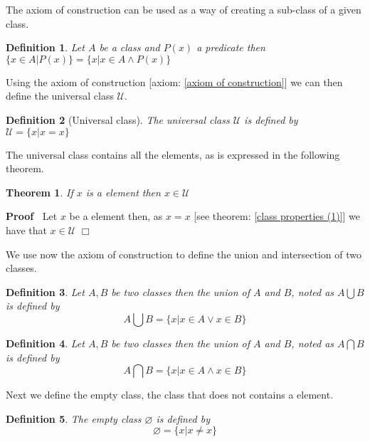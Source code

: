 \documentclass{book}
\newenvironment{proof}{\noindent\textbf{Proof\ }}{\hspace*{\fill}$\Box$\medskip}
\newtheorem{definition}{Definition}
{\theorembodyfont{\rmfamily}\newtheorem{example}{Example}}
\newtheorem{theorem}{Theorem}
\begin{document}
The axiom of construction can be used as a way of creating a sub-class of a
given class.

\begin{definition}
  Let $A$ be a class and $P (x)$ a predicate then $\{ x \in A|P (x) \} = \{
  x|x \in A \wedge P (x) \}$
\end{definition}

Using the axiom of construction [axiom: \ref{axiom of construction}] we can
then define the universal class $\mathcal{U}$.

\begin{definition}[Universal class]
  \label{universal class}{}The universal class
  $\mathcal{U}$ is defined by $\mathcal{U}= \{ x|x = x \}$
\end{definition}

The universal class contains all the elements, as is expressed in the
following theorem.

\begin{theorem}
  \label{universal class property}If $x$ is a element then $x \in \mathcal{U}$
\end{theorem}

\begin{proof}
  Let $x$ be a element then, as $x = x$ [see theorem: \ref{class properties
  (1)}] we have that $x \in \mathcal{U}$
\end{proof}

We use now the axiom of construction to define the union and intersection of
two classes.

\begin{definition}
  {}Let $A, B$ be two classes then the union of $A$ and
  $B$, noted as $A \bigcup B$ is defined by
  \[ A \bigcup B = \{ x|x \in A \vee x \in B \} \]
\end{definition}

\begin{definition}
  {}Let $A, B$ be two classes then the union of $A$ and
  $B$, noted as $A \bigcap B$ is defined by
  \[ A \bigcap B = \{ x|x \in A \wedge x \in B \} \]
\end{definition}

Next we define the empty class, the class that does not contains a element.

\begin{definition}
  \label{class empty set definition}{\index{$\emptyset$}}The empty class
  $\varnothing$ is defined by
  \[ \varnothing = \{ x|x \neq x \} \]
\end{definition}
\end{document}
